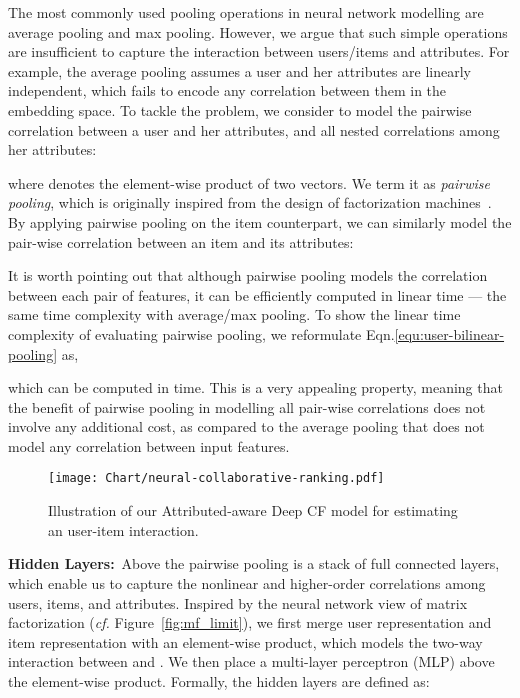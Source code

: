 \documentclass[sigconf]{acmart}
\newcommand{\cf}{\emph{cf. }}
\begin{document}
The most commonly used pooling operations in neural network modelling are average pooling and max pooling. However, we argue that such simple operations are insufficient to capture the interaction between users/items and attributes.
For example, the average pooling assumes a user and her attributes are linearly independent, which fails to encode any correlation between them in the embedding space.
To tackle the problem, we consider to model the pairwise correlation between a user and her attributes, and all nested correlations among her attributes:



where  denotes the element-wise product of two vectors. We term it as \emph{pairwise pooling}, which is originally inspired from the design of factorization machines~\cite{DBLP:conf/icdm/Rendle10,he2017neural}. By applying pairwise pooling on the item counterpart, we can similarly model the pair-wise correlation between an item and its attributes:



It is worth pointing out that although pairwise pooling models the correlation between each pair of features, it can be efficiently computed in linear time --- the same time complexity with average/max pooling. To show the linear time complexity of evaluating pairwise pooling, we reformulate Eqn.\eqref{equ:user-bilinear-pooling} as,

which can be computed in  time. This is a very appealing property, meaning that the benefit of pairwise pooling in modelling all pair-wise correlations does not involve any additional cost, as compared to the average pooling that does not model any correlation between input features.


\begin{figure}
	\centering
\texttt{[image: Chart/neural-collaborative-ranking.pdf]}\\
	\vspace{-5pt}
	\caption{Illustration of our Attributed-aware Deep CF model for estimating an user-item interaction.}\label{fig:neural-collaborative-ranking}
	\vspace{-1em}
\end{figure}

\textbf{Hidden Layers:}~Above the pairwise pooling is a stack of full connected layers, which enable us to capture the nonlinear and higher-order correlations among users, items, and attributes.
Inspired by the neural network view of matrix factorization (\cf Figure~\ref{fig:mf_limit}), we first merge user representation  and item representation  with an element-wise product, which models the two-way interaction between  and . We then place a multi-layer perceptron (MLP) above the element-wise product. Formally, the hidden layers are defined as:
\end{document}
